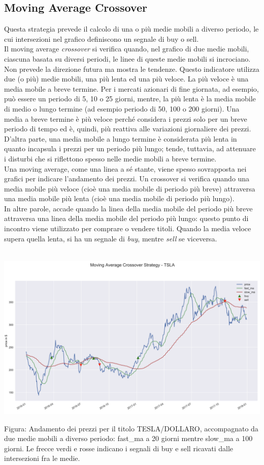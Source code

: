 \documentclass[a4paper,12pt]{report}
\begin{document}
\subsection{Moving Average Crossover}
Questa strategia prevede il calcolo di una o più medie mobili a diverso periodo, le cui intersezioni nel grafico definiscono un segnale di buy o sell.\\
Il moving average \textit{crossover} si verifica quando, nel grafico di due medie mobili, ciascuna basata su diversi periodi, le linee di queste medie mobili si incrociano.\\ Non prevede la direzione futura ma mostra le tendenze. Questo indicatore utilizza due (o più) medie mobili, una più lenta ed una più veloce. La più veloce è una media mobile a breve termine. Per i mercati azionari di fine giornata, ad esempio, può essere un periodo di 5, 10 o 25 giorni, mentre, la più lenta è la media mobile di medio o lungo termine (ad esempio periodo di 50, 100 o 200 giorni). Una media a breve termine è più veloce perché considera i prezzi solo per un breve periodo di tempo ed è, quindi, più reattiva alle variazioni giornaliere dei prezzi. D'altra parte, una media mobile a lungo termine è considerata più lenta in quanto incapsula i prezzi per un periodo più lungo; tende, tuttavia, ad attenuare i disturbi che si riflettono spesso nelle medie mobili a breve termine.
\\
Una moving average, come una linea a sé stante, viene spesso sovrapposta nei grafici per indicare l'andamento dei prezzi. Un crossover si verifica quando una media mobile più veloce (cioè una media mobile di periodo più breve) attraversa una media mobile più lenta (cioè una media mobile di periodo più lungo).\\
In altre parole, accade quando la linea della media mobile del periodo più breve attraversa una linea della media mobile del periodo più lungo: questo punto di incontro viene utilizzato per comprare o vendere titoli. Quando la media veloce supera quella lenta, si ha un segnale di \textit{buy}, mentre \textit{sell} se viceversa.\\~\\
\begin{fig}
	\includegraphics[width=\linewidth]{moving_avg}
	\caption{Figura: Andamento dei prezzi per il titolo TESLA/DOLLARO, accompagnato da due medie mobili a diverso periodo: fast\_ma a 20 giorni mentre slow\_ma a 100 giorni. Le frecce verdi e rosse indicano i segnali di buy e sell ricavati dalle intersezioni fra le medie.}
\end{fig}
\end{document}
